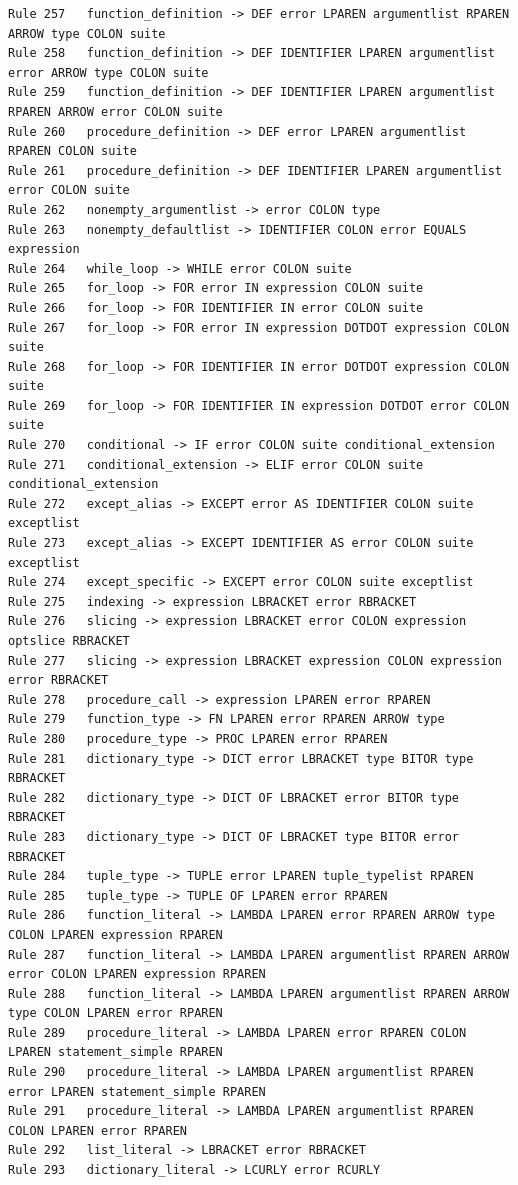 \documentclass{article}
\begin{document}
\begin{verbatim}
Rule 257   function_definition -> DEF error LPAREN argumentlist RPAREN ARROW type COLON suite
Rule 258   function_definition -> DEF IDENTIFIER LPAREN argumentlist error ARROW type COLON suite
Rule 259   function_definition -> DEF IDENTIFIER LPAREN argumentlist RPAREN ARROW error COLON suite
Rule 260   procedure_definition -> DEF error LPAREN argumentlist RPAREN COLON suite
Rule 261   procedure_definition -> DEF IDENTIFIER LPAREN argumentlist error COLON suite
Rule 262   nonempty_argumentlist -> error COLON type
Rule 263   nonempty_defaultlist -> IDENTIFIER COLON error EQUALS expression
Rule 264   while_loop -> WHILE error COLON suite
Rule 265   for_loop -> FOR error IN expression COLON suite
Rule 266   for_loop -> FOR IDENTIFIER IN error COLON suite
Rule 267   for_loop -> FOR error IN expression DOTDOT expression COLON suite
Rule 268   for_loop -> FOR IDENTIFIER IN error DOTDOT expression COLON suite
Rule 269   for_loop -> FOR IDENTIFIER IN expression DOTDOT error COLON suite
Rule 270   conditional -> IF error COLON suite conditional_extension
Rule 271   conditional_extension -> ELIF error COLON suite conditional_extension
Rule 272   except_alias -> EXCEPT error AS IDENTIFIER COLON suite exceptlist
Rule 273   except_alias -> EXCEPT IDENTIFIER AS error COLON suite exceptlist
Rule 274   except_specific -> EXCEPT error COLON suite exceptlist
Rule 275   indexing -> expression LBRACKET error RBRACKET
Rule 276   slicing -> expression LBRACKET error COLON expression optslice RBRACKET
Rule 277   slicing -> expression LBRACKET expression COLON expression error RBRACKET
Rule 278   procedure_call -> expression LPAREN error RPAREN
Rule 279   function_type -> FN LPAREN error RPAREN ARROW type
Rule 280   procedure_type -> PROC LPAREN error RPAREN
Rule 281   dictionary_type -> DICT error LBRACKET type BITOR type RBRACKET
Rule 282   dictionary_type -> DICT OF LBRACKET error BITOR type RBRACKET
Rule 283   dictionary_type -> DICT OF LBRACKET type BITOR error RBRACKET
Rule 284   tuple_type -> TUPLE error LPAREN tuple_typelist RPAREN
Rule 285   tuple_type -> TUPLE OF LPAREN error RPAREN
Rule 286   function_literal -> LAMBDA LPAREN error RPAREN ARROW type COLON LPAREN expression RPAREN
Rule 287   function_literal -> LAMBDA LPAREN argumentlist RPAREN ARROW error COLON LPAREN expression RPAREN
Rule 288   function_literal -> LAMBDA LPAREN argumentlist RPAREN ARROW type COLON LPAREN error RPAREN
Rule 289   procedure_literal -> LAMBDA LPAREN error RPAREN COLON LPAREN statement_simple RPAREN
Rule 290   procedure_literal -> LAMBDA LPAREN argumentlist RPAREN error LPAREN statement_simple RPAREN
Rule 291   procedure_literal -> LAMBDA LPAREN argumentlist RPAREN COLON LPAREN error RPAREN
Rule 292   list_literal -> LBRACKET error RBRACKET
Rule 293   dictionary_literal -> LCURLY error RCURLY
\end{verbatim}
\end{document}
